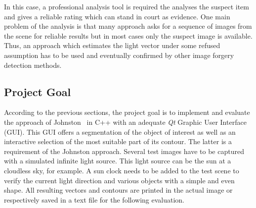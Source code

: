 In this case, a professional analysis tool is required the analyses the suspect item and gives a reliable rating which can stand in court as evidence. One main problem of the analysis is that many approach asks for a sequence of images from the scene for reliable results but in most cases only the suspect image is available. Thus, an approach which estimates the light vector under some refused assumption has to be used and eventually confirmed by other image forgery detection methods. 

\subsection{Project Goal}\label{sec:Project Goal}

According to the previous sections, the project goal is to implement and evaluate the approach of Johnston~\cite{Johnson} in C++ with an adequate \textit{Qt} Graphic User Interface (GUI). This GUI offers a segmentation of the object of interest as well as an interactive selection of the most suitable part of its contour. The latter is a requirement of the Johnston approach. Several test images have to be captured with a simulated infinite light source. This light source can be the sun at a cloudless sky, for example. A sun clock needs to be added to the test scene to verify the current light direction and various objects with a simple and even shape. All resulting vectors and contours are printed in the actual image or respectively saved in a text file for the following evaluation.



\newpage


















